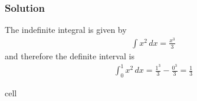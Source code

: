\documentclass[letterpaper,10pt,english]{jupyterBook}
\begin{document}
\subsubsection{Solution}
\label{\detokenize{01:id2}}
\sphinxAtStartPar
The indefinite integral is given by
\begin{equation*}
\begin{split}\int x^2 \,dx = \frac{x^3}{3}\end{split}
\end{equation*}
\sphinxAtStartPar
and therefore the definite interval is
\begin{equation*}
\begin{split}\int_{0}^{1} x^2 \,dx = \frac{1^3}{3} - \frac{0^3}{3} = \frac13\end{split}
\end{equation*}
\begin{sphinxuseclass}{cell}\begin{sphinxVerbatimInput}


\end{sphinxVerbatimInput}
\end{sphinxuseclass}
\end{document}
